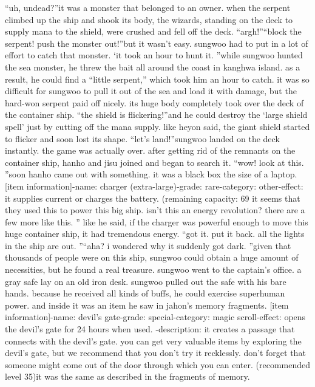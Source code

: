 “uh, undead?”it was a monster that belonged to an owner.
when the serpent climbed up the ship and shook its body, the wizards, standing on the deck to supply mana to the shield, were crushed and fell off the deck.
“argh!”“block the serpent! push the monster out!”but it wasn’t easy.
 sungwoo had to put in a lot of effort to catch that monster.
‘it took an hour to hunt it.
”while sungwoo hunted the sea monster, he threw the bait all around the coast in kanghwa island.
 as a result, he could find a “little serpent,” which took him an hour to catch.
 it was so difficult for sungwoo to pull it out of the sea and load it with damage, but the hard-won serpent paid off nicely.
 its huge body completely took over the deck of the container ship.
“the shield is flickering!”and he could destroy the ‘large shield spell’ just by cutting off the mana supply.
like heyon said, the giant shield started to flicker and soon lost its shape.
“let’s land!”sungwoo landed on the deck instantly.
 the game was actually over.
after getting rid of the remnants on the container ship, hanho and jisu joined and began to search it.
“wow! look at this.
”soon hanho came out with something.
 it was a black box the size of a laptop.
[item information]-name: charger (extra-large)-grade: rare-category: other-effect: it supplies current or charges the battery.
 (remaining capacity: 69%
 it seems that they used this to power this big ship.
 isn’t this an energy revolution? there are a few more like this.
”
like he said, if the charger was powerful enough to move this huge container ship, it had tremendous energy.
“got it.
 put it back.
 all the lights in the ship are out.
”“aha? i wondered why it suddenly got dark.
”given that thousands of people were on this ship, sungwoo could obtain a huge amount of necessities, but he found a real treasure.
sungwoo went to the captain’s office.
a gray safe lay on an old iron desk.
 sungwoo pulled out the safe with his bare hands.
because he received all kinds of buffs, he could exercise superhuman power.
and inside it was an item he saw in jahon’s memory fragments.
[item information]-name: devil’s gate-grade: special-category: magic scroll-effect: opens the devil’s gate for 24 hours when used.
-description: it creates a passage that connects with the devil’s gate.
 you can get very valuable items by exploring the devil’s gate, but we recommend that you don’t try it recklessly.
 don’t forget that someone might come out of the door through which you can enter.
 (recommended level 35)it was the same as described in the fragments of memory.
